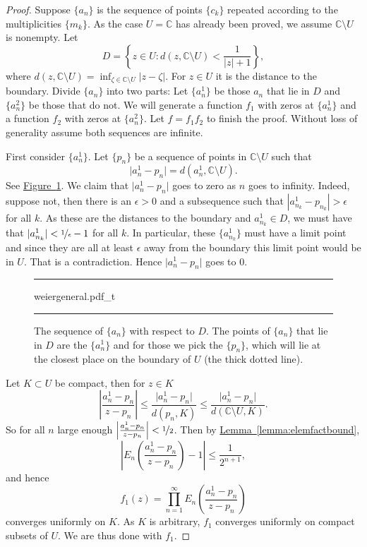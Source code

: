 \documentclass[12pt,openany]{book}
\newcommand{\sabs}[1]{\lvert {#1} \rvert}
\newcommand{\abs}[1]{\left\lvert {#1} \right\rvert}
\newcommand{\C}{{\mathbb{C}}}
\theoremstyle{plain}
\theoremstyle{remark}
\theoremstyle{definition}
\newenvironment{myfig}{%
\begin{figure}[h!t]
\noindent\rule{\textwidth}{0.5pt}\vspace{12pt}\par\centering}%
{\par\noindent\rule{\textwidth}{0.5pt}
\end{figure}}
\theoremstyle{exercise}
\theoremstyle{example}
\newcommand{\figureref}[1]{\hyperref[#1]{Figure~\ref*{#1}}}
\newcommand{\lemmaref}[1]{\hyperref[#1]{Lemma~\ref*{#1}}}
\begin{document}
\begin{proof}
Suppose $\{ a_n \}$ is the sequence of points $\{ c_k \}$ repeated
according to the multiplicities $\{ m_k \}$.
As the case $U=\C$ has already been proved, we assume $\C \setminus
U$ is nonempty.
Let
\begin{equation*}
D = \left\{ z \in U :
d(z,\C \setminus U) < \frac{1}{\sabs{z}+1}
\right\} ,
\end{equation*}
where $d(z,\C\setminus U) = \inf_{\zeta \in \C \setminus U}
\sabs{z-\zeta}$.  For $z \in U$ it is the distance to the boundary.
Divide $\{ a_n \}$ into two parts:
Let $\{ a^1_n \}$ be those $a_n$ that lie in $D$ and $\{ a^2_n \}$
be those that do not.
We will generate a function $f_1$ with zeros at $\{ a^1_n \}$ and
a function $f_2$ with zeros at $\{ a^2_n \}$.  Let $f = f_1 f_2$
to finish the proof.
Without loss of generality assume both sequences are infinite.

First consider $\{ a^1_n \}$.  Let $\{ p_n \}$ be a sequence of points in
$\C \setminus U$ such
that
\begin{equation*}
\sabs{a^1_n-p_n} = d(a^1_n,\C \setminus U).
\end{equation*}
See \figureref{fig:weiergeneral}.
We claim that 
$\sabs{a^1_n-p_n}$ goes to zero as $n$ goes to infinity.
Indeed, suppose not, then there is an $\epsilon > 0$ and
a subsequence such that 
$\abs{a^1_{n_k}-p_{n_k}} > \epsilon$ for all $k$.  As these are the
distances to the boundary and $a^1_{n_k} \in D$,
we must have that $\sabs{a^1_{n_k}} < \nicefrac{1}{\epsilon}-1$ for all $k$.
In particular, these $\{ a^1_{n_k} \}$ must have a limit point and since they
are all at least $\epsilon$ away from the boundary this limit point would be
in $U$.  That is a contradiction.  Hence
$\sabs{a^1_n-p_n}$ goes to $0$.

\begin{myfig}
{weiergeneral.pdf_t}
\caption{The sequence of $\{ a_n \}$ with respect to $D$.  The 
points of $\{ a_n \}$ that lie in $D$ are the $\{ a^1_n \}$ and for those we
pick the $\{ p_n \}$, which will lie at the closest place on the boundary of
$U$ (the thick dotted line).\label{fig:weiergeneral}}
\end{myfig}

Let $K \subset U$ be compact, then for $z \in K$
\begin{equation*}
\abs{\frac{a^1_n-p_n}{z-p_n}}
\leq
\frac{\sabs{a^1_n-p_n}}{d(p_n,K)}
\leq
\frac{\sabs{a^1_n-p_n}}{d(\C \setminus U,K)} .
\end{equation*}
So for all $n$ large enough
$\abs{\frac{a^1_n-p_n}{z-p_n}} < \nicefrac{1}{2}$.
Then by \lemmaref{lemma:elemfactbound},
\begin{equation*}
\abs{E_n\left(
\frac{a^1_n-p_n}{z-p_n}
\right)-1} \leq \frac{1}{2^{n+1}} ,
\end{equation*}
and hence
\begin{equation*}
f_1(z)
=
\prod_{n=1}^\infty
E_n\left(
\frac{a^1_n-p_n}{z-p_n}
\right)
\end{equation*}
converges uniformly on $K$.  As $K$ is arbitrary, $f_1$ converges
uniformly on compact subsets of $U$.  We are thus done with $f_1$.


\end{proof}
\end{document}
